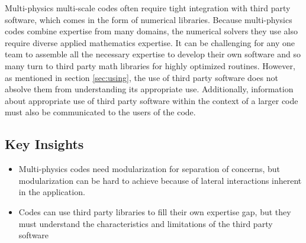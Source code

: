 Multi-physics multi-scale codes often require tight integration with
third party software, which comes in the form of numerical
libraries. Because multi-physics codes combine expertise from many
domains, the numerical solvers they use also require diverse applied
mathematics expertise. It can be challenging  for any one team to
assemble all the necessary expertise to develop their own software and
so many turn to third party math libraries for highly optimized
routines.  However, as mentioned in section \ref{sec:using}, the use
of third party software does not absolve them from understanding its
appropriate use.  Additionally, information about appropriate use of
third party software within the context of a larger code must also be
communicated to the users of the code. 

\subsection*{Key Insights}
\label{domain-insights}
\begin{itemize}
\item Multi-physics codes need modularization for separation of
concerns, but modularization can be hard to achieve because of lateral
interactions inherent in the application.
\item Codes can use third party libraries to fill their own expertise
gap, but they must understand the characteristics and limitations of
the third party software 
\end {itemize}